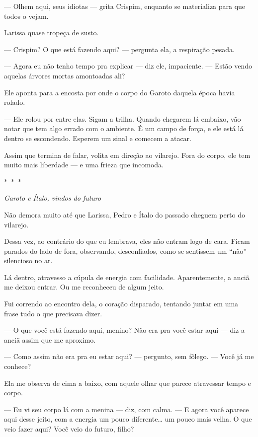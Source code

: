 — Olhem aqui, seus idiotas — grita Crispim, enquanto se materializa para que todos o vejam.

Larissa quase tropeça de susto.

— Crispim? O que está fazendo aqui? — pergunta ela, a respiração pesada.

— Agora eu não tenho tempo pra explicar — diz ele, impaciente. — Estão vendo aquelas árvores mortas amontoadas ali?

Ele aponta para a encosta por onde o corpo do Garoto daquela época havia rolado.

— Ele rolou por entre elas. Sigam a trilha.  
Quando chegarem lá embaixo, vão notar que tem algo errado com o ambiente.  
É um campo de força, e ele está lá dentro se escondendo.  
Esperem um sinal e comecem a atacar.

Assim que termina de falar, volita em direção ao vilarejo.  
Fora do corpo, ele tem muito mais liberdade — e uma frieza que incomoda.

\begin{center}
  $\ast$~$\ast$~$\ast$

  \textit{Garoto e Ítalo, vindos do futuro}
\end{center}

Não demora muito até que Larissa, Pedro e Ítalo do passado cheguem perto do vilarejo.

Dessa vez, ao contrário do que eu lembrava, eles não entram logo de cara.  
Ficam parados do lado de fora, observando, desconfiados, como se sentissem um “não” silencioso no ar.

Lá dentro, atravesso a cúpula de energia com facilidade.
Aparentemente, a anciã me deixou entrar.  
Ou me reconheceu de algum jeito.

Fui correndo ao encontro dela, o coração disparado, tentando juntar em uma frase tudo o que precisava dizer.

— O que você está fazendo aqui, menino? Não era pra você estar aqui — diz a anciã assim que me aproximo.

— Como assim não era pra eu estar aqui? — pergunto, sem fôlego. — Você já me conhece?

Ela me observa de cima a baixo, com aquele olhar que parece atravessar tempo e corpo.

— Eu vi seu corpo lá com a menina — diz, com calma. — E agora você aparece aqui desse jeito, com a energia um pouco diferente… um pouco mais velha.  
O que veio fazer aqui?  
Você veio do futuro, filho?

